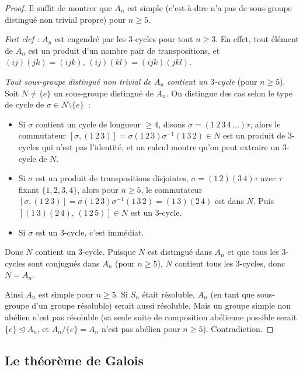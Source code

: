 \documentclass[12pt,a4paper,openany]{book}
\theoremstyle{definition}
\begin{document}
\begin{proof}
Il suffit de montrer que $A_n$ est simple (c'est-à-dire n'a pas de
sous-groupe distingué non trivial propre) pour $n \geq 5$.

\emph{Fait clef :} $A_n$ est engendré par les $3$-cycles pour tout $n \geq 3$.
En effet, tout élément de $A_n$ est un produit d'un nombre pair de
transpositions, et $(ij)(jk) = (ijk)$, $(ij)(kl) = (ijk)(jkl)$.

\emph{Tout sous-groupe distingué non trivial de $A_n$ contient un $3$-cycle}
(pour $n \geq 5$). Soit $N \neq \{e\}$ un sous-groupe distingué de $A_n$.
On distingue des cas selon le type de cycle de $\sigma \in N \setminus \{e\}$~:

\begin{itemize}
  \item Si $\sigma$ contient un cycle de longueur $\geq 4$, disons
    $\sigma = (1\,2\,3\,4\,\ldots)\tau$, alors le commutateur
    $[\sigma, (1\,2\,3)] = \sigma(1\,2\,3)\sigma^{-1}(1\,3\,2) \in N$
    est un produit de $3$-cycles qui n'est pas l'identité, et un
    calcul montre qu'on peut extraire un $3$-cycle de $N$.
  \item Si $\sigma$ est un produit de transpositions disjointes,
    $\sigma = (1\,2)(3\,4)\tau$ avec $\tau$ fixant $\{1,2,3,4\}$,
    alors pour $n \geq 5$, le commutateur
    $[\sigma, (1\,2\,3)] = \sigma(1\,2\,3)\sigma^{-1}(1\,3\,2) = (1\,3)(2\,4)$
    est dans $N$. Puis $[(1\,3)(2\,4),\,(1\,2\,5)] \in N$ est un $3$-cycle.
  \item Si $\sigma$ est un $3$-cycle, c'est immédiat.
\end{itemize}

Donc $N$ contient un $3$-cycle. Puisque $N$ est distingué dans $A_n$ et que
tous les $3$-cycles sont conjugués dans $A_n$ (pour $n \geq 5$), $N$
contient tous les $3$-cycles, donc $N = A_n$.

Ainsi $A_n$ est simple pour $n \geq 5$. Si $S_n$ était résoluble, $A_n$
(en tant que sous-groupe d'un groupe résoluble) serait aussi résoluble. Mais un
groupe simple non abélien n'est pas résoluble (sa seule suite de composition
abélienne possible serait $\{e\} \trianglelefteq A_n$, et $A_n/\{e\} = A_n$
n'est pas abélien pour $n \geq 5$). Contradiction.
\end{proof}

\subsection{Le théorème de Galois}\label{ssec:theoreme-galois}
\end{document}
